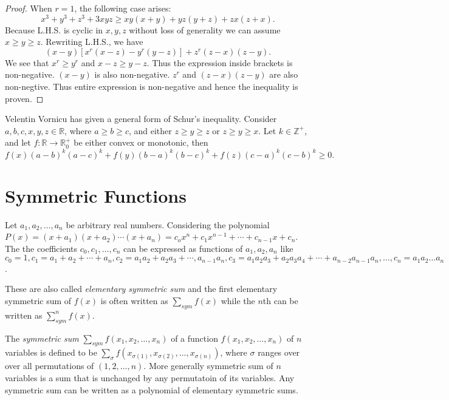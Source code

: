 \begin{proof}
  When $r = 1$, the following case arises:
  $$x^3 + y^3 + z^3 + 3xyz \geq xy(x + y) + yz(y + z) + zx(z + x).$$
  Because L.H.S. is cyclic in $x, y, z$ without loss of generality we can assume $x\geq y \geq z$. Rewriting L.H.S., we have
  $$(x - y)[x^r(x - z) - y^r(y - z)] + z^r(z - x)(z - y).$$
  We see that $x^r \geq y^r$ and $x - z\geq y - z$. Thus the expression inside brackets is non-negative. $(x - y)$ is also
  non-negative. $z^r$ and $(z - x)(z - y)$ are also non-negtive. Thus entire expression is non-negative and hence the inequality is
  proven.
\end{proof}

\noindent Velentin Vornicu has given a general form of Schur's inequality. Consider $a, b, c, x, y, z\in\mathbb{R}$, where $a\geq
b\geq c$, and either $z\geq y\geq z$ or $z\geq y\geq x$. Let $k\in\mathbb{Z}^+$, and let $f:\mathbb{R}\rightarrow\mathbb{R}_0^+$ be
either convex or monotonic, then
\begin{equation}
  f(x)(a - b)^k(a - c)^k + f(y)(b - a)^k(b - c)^k + f(z)(c - a)^k(c - b)^k\geq 0.
\end{equation}

\section{Symmetric Functions}
Let $a_1, a_2, \ldots, a_n$ be arbitrary real numbers. Considering the polynomial $P(x) = (x + a_1)(x + a_2)\cdots(x + a_n) =
c_ox^n + c_1x^{n - 1} + \cdots + c_{n-1}x + c_n$. The the coefficients $c_0, c_1, \ldots, c_n$ can be expressed as functions of
$a_1, a_2, a_n$ like $c_0 = 1, c_1 = a_1 + a_2 + \cdots + a_n, c_2 = a_1a_2 + a_2a_3 + \cdots, a_{n-1}a_n, c_3 = a_1a_2a_3 +
a_2a_3a_4 + \cdots + a_{n-2}a_{n-1}a_n, \ldots, c_n = a_1a_2\ldots a_n$.

These are also called \textit{elementary symmetric sum} and the first elementary symmetric sum of $f(x)$ is often written as
$\sum_{sym}f(x)$ while the $n$th can be written as $\sum_{sym}^nf(x)$.

The \textit{symmetric sum} $\sum_{sym}f(x_1, x_2, \ldots, x_n)$ of a function $f(x_1, x_2, \ldots, x_n)$ of $n$ variables is
defined to be $\sum_{\sigma}f(x_{\sigma(1)}, x_{\sigma(2)}, \ldots, x_{\sigma(n)})$, where $\sigma$ ranges over over all
permutations of $(1, 2, \ldots, n)$. More generally symmetric sum of $n$ variables is a sum that is unchanged by any permutatoin of
its variables. Any symmetric sum can be written as a polynomial of elementary symmetric sums.

